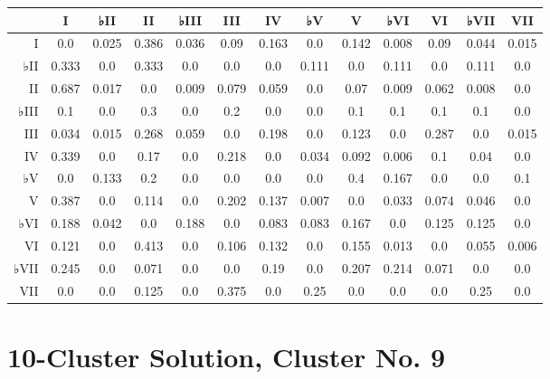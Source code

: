 \begin{table}[htbp]
\begin{minipage}{\linewidth}
\setlength{\tymax}{0.5\linewidth}
\centering
\small
\begin{tabulary}{\textwidth}{@{}RCCCCCCCCCCCC@{}} \toprule
&I&♭II&II&♭III&III&IV&♭V&V&♭VI&VI&♭VII&VII\\
\midrule
I&0.0&0.025&0.386&0.036&0.09&0.163&0.0&0.142&0.008&0.09&0.044&0.015\\
♭II&0.333&0.0&0.333&0.0&0.0&0.0&0.111&0.0&0.111&0.0&0.111&0.0\\
II&0.687&0.017&0.0&0.009&0.079&0.059&0.0&0.07&0.009&0.062&0.008&0.0\\
♭III&0.1&0.0&0.3&0.0&0.2&0.0&0.0&0.1&0.1&0.1&0.1&0.0\\
III&0.034&0.015&0.268&0.059&0.0&0.198&0.0&0.123&0.0&0.287&0.0&0.015\\
IV&0.339&0.0&0.17&0.0&0.218&0.0&0.034&0.092&0.006&0.1&0.04&0.0\\
♭V&0.0&0.133&0.2&0.0&0.0&0.0&0.0&0.4&0.167&0.0&0.0&0.1\\
V&0.387&0.0&0.114&0.0&0.202&0.137&0.007&0.0&0.033&0.074&0.046&0.0\\
♭VI&0.188&0.042&0.0&0.188&0.0&0.083&0.083&0.167&0.0&0.125&0.125&0.0\\
VI&0.121&0.0&0.413&0.0&0.106&0.132&0.0&0.155&0.013&0.0&0.055&0.006\\
♭VII&0.245&0.0&0.071&0.0&0.0&0.19&0.0&0.207&0.214&0.071&0.0&0.0\\
VII&0.0&0.0&0.125&0.0&0.375&0.0&0.25&0.0&0.0&0.0&0.25&0.0\\

\bottomrule

\end{tabulary}
\end{minipage}
\end{table}

\section{10-Cluster Solution, Cluster No. 9}
\label{10-clustersolutionclusterno.9}

